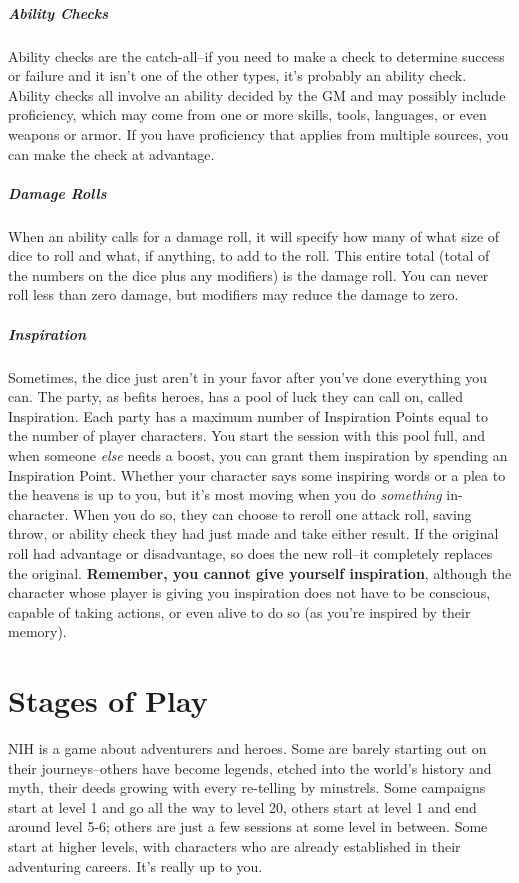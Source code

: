 \subparagraph*{Ability Checks} Ability checks are the catch-all--if you need to make a check to determine success or failure and it isn't one of the other types, it's probably an ability check. Ability checks all involve an ability decided by the GM and may possibly include proficiency, which may come from one or more skills, tools, languages, or even weapons or armor. If you have proficiency that applies from multiple sources, you can make the check at advantage.

\subparagraph*{Damage Rolls} When an ability calls for a damage roll, it will specify how many of what size of dice to roll and what, if anything, to add to the roll. This entire total (total of the numbers on the dice plus any modifiers) is the damage roll. You can never roll less than zero damage, but modifiers may reduce the damage to zero.

\subparagraph*{Inspiration} Sometimes, the dice just aren't in your favor after you've done everything you can. The party, as befits heroes, has a pool of luck they can call on, called Inspiration. Each party has a maximum number of Inspiration Points equal to the number of player characters. You start the session with this pool full, and when someone \textit{else} needs a boost, you can grant them inspiration by spending an Inspiration Point. Whether your character says some inspiring words or a plea to the heavens is up to you, but it's most moving when you do \textit{something} in-character. When you do so, they can choose to reroll one attack roll, saving throw, or ability check they had just made and take either result. If the original roll had advantage or disadvantage, so does the new roll--it completely replaces the original. \textbf{Remember, you cannot give yourself inspiration}, although the character whose player is giving you inspiration does not have to be conscious, capable of taking actions, or even alive to do so (as you're inspired by their memory).

\section{Stages of Play}\label{sec:stages-of-play}
NIH is a game about adventurers and heroes. Some are barely starting out on their journeys--others have become legends, etched into the world's history and myth, their deeds growing with every re-telling by minstrels. Some campaigns start at level 1 and go all the way to level 20, others start at level 1 and end around level 5-6; others are just a few sessions at some level in between. Some start at higher levels, with characters who are already established in their adventuring careers. It's really up to you.

